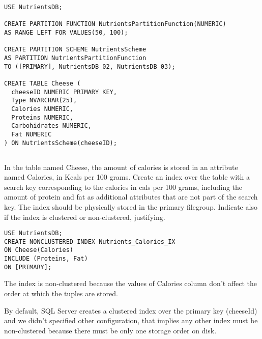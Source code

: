 \begin{lstlisting}
USE NutrientsDB;

CREATE PARTITION FUNCTION NutrientsPartitionFunction(NUMERIC)
AS RANGE LEFT FOR VALUES(50, 100);

CREATE PARTITION SCHEME NutrientsScheme
AS PARTITION NutrientsPartitionFunction
TO ([PRIMARY], NutrientsDB_02, NutrientsDB_03);

CREATE TABLE Cheese (
  cheeseID NUMERIC PRIMARY KEY,
  Type NVARCHAR(25),
  Calories NUMERIC,
  Proteins NUMERIC,
  Carbohidrates NUMERIC,
  Fat NUMERIC
) ON NutrientsScheme(cheeseID);
\end{lstlisting}

	\subsection{}
	{\color{gray}In the table named Cheese, the amount of calories is stored in an attribute named Calories, in Kcals per 100 grams. Create an index over the table with a search key corresponding to the calories in cals per 100 grams, including the amount of protein and fat as additional attributes that are not part of the search key. The index should be physically stored in the primary filegroup. Indicate also if the index is clustered or non-clustered, justifying.}

\begin{lstlisting}
USE NutrientsDB;
CREATE NONCLUSTERED INDEX Nutrients_Calories_IX
ON Cheese(Calories)
INCLUDE (Proteins, Fat)
ON [PRIMARY];
\end{lstlisting}

	The index is non-clustered because the values of Calories column don't affect the order at which the tuples are stored.

	By default, SQL Server creates a clustered index over the primary key (cheeseId) and we didn't specified other configuration, that implies any other index must be non-clustered because there must be only one storage order on disk.


